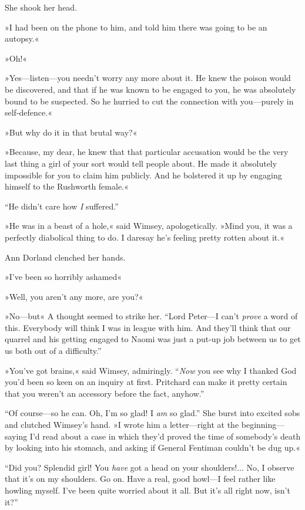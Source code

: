 She shook her head.

»I had been on the phone to him, and told him there was going to be an autopsy.«

»Oh!«

»Yes\allowbreak---\allowbreak listen---you needn't worry any more about it. He knew the poison would be discovered, and that if he was known to be engaged to you, he was absolutely bound to be suspected. So he hurried to cut the connection with you\allowbreak---\allowbreak purely in self-defence.«

»But why do it in that brutal way?«

»Because, my dear, he knew that that particular accusation would be the very last thing a girl of your sort would tell people about. He made it absolutely impossible for you to claim him publicly. And he bolstered it up by engaging himself to the Rushworth female.«

\enquote{He didn't care how \textit{I} suffered.}

»He was in a beast of a hole,« said Wimsey, apologetically. »Mind you, it was a perfectly diabolical thing to do. I daresay he's feeling pretty rotten about it.«

Ann Dorland clenched her hands.

»I've been so horribly ashamed\longdash«

»Well, you aren't any more, are you?«

»No\allowbreak---\allowbreak but\longdash« A thought seemed to strike her. \enquote{Lord Peter\allowbreak---\allowbreak I can't \textit{prove} a word of this. Everybody will think I was in league with him. And they'll think that our quarrel and his getting engaged to Naomi was just a put-up job between us to get us both out of a difficulty.}

»You've got brains,« said Wimsey, admiringly. \enquote{\textit{Now} you see why I thanked God you'd been so keen on an inquiry at first. Pritchard can make it pretty certain that you weren't an accessory before the fact, anyhow.}

\enquote{Of course\allowbreak---\allowbreak so he can. Oh, I'm so glad! I \textit{am} so glad.} She burst into excited sobs and clutched Wimsey's hand. »I wrote him a letter\allowbreak---\allowbreak right at the beginning\allowbreak---\allowbreak saying I'd read about a case in which they'd proved the time of somebody's death by looking into his stomach, and asking if General Fentiman couldn't be dug up.«

\enquote{Did you? Splendid girl! You \textit{have} got a head on your shoulders!... No, I observe that it's on my shoulders. Go on. Have a real, good howl\allowbreak---\allowbreak I feel rather like howling myself. I've been quite worried about it all. But it's all right now, isn't it?}

